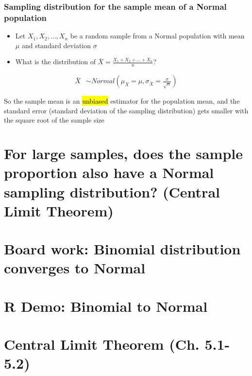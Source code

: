 \documentclass[t,compress,mathserif]{beamer}
\begin{document}
\begin{frame}
\frametitle{Sampling distribution for the sample mean of a Normal population}
\begin{itemize}
    \item Let $X_1, X_2, \ldots, X_n$ be a random sample from a Normal population with mean $\mu$ and standard deviation $\sigma$
    \item What is the distribution of $\bar{X}=\frac{X_1 + X_2 + \ldots + X_n}{n}$?
\end{itemize}
\begin{align*}
 \bar{X} &\sim Normal\left(\mu_{\bar{X}}=\mu, \sigma_{\bar{X}}=\frac{\sigma}{\sqrt{n}}\right)
\end{align*}

So the sample mean is an \hl{unbiased} estimator for the population mean, and the standard error (standard deviation of the sampling distribution) gets smaller with the square root of the sample size
\end{frame}


\section{For large samples, does the sample proportion also have a Normal sampling distribution? (Central Limit Theorem)}



\section{Board work: Binomial distribution converges to Normal}



\section{R Demo: Binomial to Normal}


\section{Central Limit Theorem (Ch. 5.1-5.2)}

\end{document}
